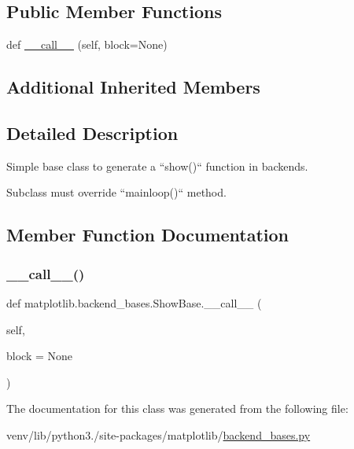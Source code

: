 \subsection*{Public Member Functions}
\begin{DoxyCompactItemize}
\item 
def \hyperlink{classmatplotlib_1_1backend__bases_1_1ShowBase_a1e0ae19e7681e81c3dd9200f4d382e7a}{\+\_\+\+\_\+call\+\_\+\+\_\+} (self, block=None)
\end{DoxyCompactItemize}
\subsection*{Additional Inherited Members}


\subsection{Detailed Description}
\begin{DoxyVerb}Simple base class to generate a ``show()`` function in backends.

Subclass must override ``mainloop()`` method.
\end{DoxyVerb}
 

\subsection{Member Function Documentation}
\mbox{\label{classmatplotlib_1_1backend__bases_1_1ShowBase_a1e0ae19e7681e81c3dd9200f4d382e7a}} 
\subsubsection{\texorpdfstring{\+\_\+\+\_\+call\+\_\+\+\_\+()}{\_\_call\_\_()}}
{\footnotesize\ttfamily def matplotlib.\+backend\+\_\+bases.\+Show\+Base.\+\_\+\+\_\+call\+\_\+\+\_\+ (\begin{DoxyParamCaption}\item[{}]{self,  }\item[{}]{block = {\ttfamily None} }\end{DoxyParamCaption})}



The documentation for this class was generated from the following file\+:\begin{DoxyCompactItemize}
\item 
venv/lib/python3./site-\/packages/matplotlib/\hyperlink{backend__bases_8py}{backend\+\_\+bases.\+py}\end{DoxyCompactItemize}
